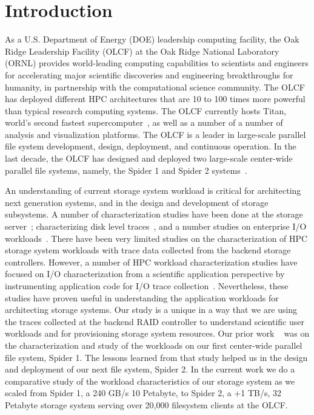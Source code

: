 \section{Introduction}
\label{sec:intro}

As a U.S. Department of Energy (DOE) leadership computing facility, the Oak
Ridge Leadership Facility (OLCF) at the Oak Ridge National Laboratory (ORNL)
provides world-leading computing capabilities to scientists and engineers for
accelerating major scientific discoveries and engineering breakthroughs for
humanity, in partnership with the computational science community. The OLCF has
deployed different HPC architectures that are 10 to 100 times more powerful
than typical research computing systems. The OLCF currently hosts Titan,
world's second fastest supercomputer~\cite{titan}, as well as a number of a
number of analysis and visualization platforms. The OLCF is a leader in large-scale
parallel file system development, design, deployment, and continuous operation. In the
last decade, the OLCF has designed and deployed two large-scale center-wide
parallel file systems, namely, the Spider 1 and Spider 2 systems~\cite{spider1,
spider2}.

An understanding of current storage system workload is critical for
architecting next generation systems, and in the design and development of
storage subsystems. A number of characterization studies have been done at the
storage server~\cite{hpca04:zhang, iiswc08:swaroop}; characterizing disk level
traces~\cite{ sigmetrics09:alma}, and a number studies on enterprise I/O
workloads~\cite{gmach2007workload, hpca04:zhang}. There have been very limited
studies on the characterization of HPC storage system workloads with trace data
collected from the backend storage controllers. However, a number of HPC workload
characterization studies have focused on I/O characterization from a scientific
application perspective by instrumenting application code for I/O trace
collection~\cite{ iasds09:philip, shan2008characterizing}. Nevertheless, these
studies have proven useful in understanding the application workloads for
architecting storage systems. Our study is a unique in a way that we are using
the traces collected at the backend RAID controller to understand scientific
user workloads and for provisioning storage system resources. Our prior work
~\cite{ spider1-workload} was on the characterization and study of the
workloads on our first center-wide parallel file system, Spider 1. The lessons
learned from that study helped us in the design and deployment of our next file
system, Spider 2. In the current work we do a comparative study of the workload
characteristics of our storage system as we scaled from Spider 1, a 240 GB/s
10 Petabyte, to Spider 2, a +1 TB/s, 32 Petabyte storage system serving over 
20,000 filesystem clients at the OLCF.

